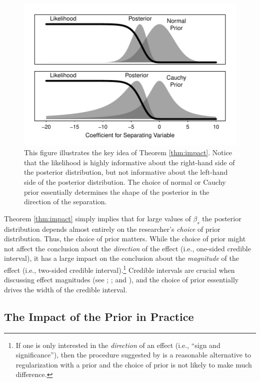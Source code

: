 \documentclass[12pt]{article}
\begin{document}
\begin{figure}[H]
\begin{center}
\includegraphics[scale = .8]{figs/thm-1-illustrated.pdf}
\caption{This figure illustrates the key idea of Theorem \ref{thm:impact}. Notice that the likelihood is highly informative about the right-hand side of the posterior distribution, but not informative about the left-hand side of the posterior distribution. The choice of normal or Cauchy prior essentially determines the shape of the posterior in the direction of the separation.}\label{fig:thm-1-illustrated}
\end{center}
\end{figure}

Theorem \ref{thm:impact} simply implies that for large values of $\beta_s$ the posterior distribution depends almost entirely on the researcher's \emph{choice} of prior distribution. 
Thus, the choice of prior matters. 
While the choice of prior might not affect the conclusion about the \emph{direction} of the effect (i.e., one-sided credible interval), it has a large impact on the conclusion about the \emph{magnitude} of the effect (i.e., two-sided credible interval).\footnote{
If one is only interested in the \textit{direction} of an effect (i.e., ``sign and significance''), then the procedure suggested by \cite{Geyer2009} is a reasonable alternative to regularization with a prior and the choice of prior is not likely to make much difference.} 
Credible intervals are crucial when discussing effect magnitudes (see \citealt{KingTomzWittenberg2000}; \citealt{Rainey2014a}; and \citealt{Gross2014}), and the choice of prior essentially drives the width of the credible interval.

\subsection*{The Impact of the Prior in Practice}
\end{document}
